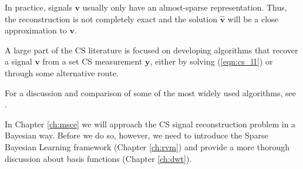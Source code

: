 In practice, signals $\bm v$ usually only have an almost-sparse representation.
Thus, the reconstruction is not completely exact and the solution $\bm{\hat v}$ will be a close approximation to $\bm v$.

A large part of the CS literature is focused on developing algorithms that recover a signal $\bm v$ from a set CS measurement $\bm y$, either by solving (\ref{eqn:cs_l1}) or through some alternative route.

For a discussion and comparison of some of the most widely used algorithms, see \cite{pilikos2014}.

In Chapter \ref{ch:msce} we will approach the CS signal reconstruction problem in a Bayesian way.
Before we do so, however, we need to introduce the Sparse Bayesian Learning framework (Chapter \ref{ch:rvm}) and provide a more thorough discussion about basis functions (Chapter \ref{ch:dwt}).

